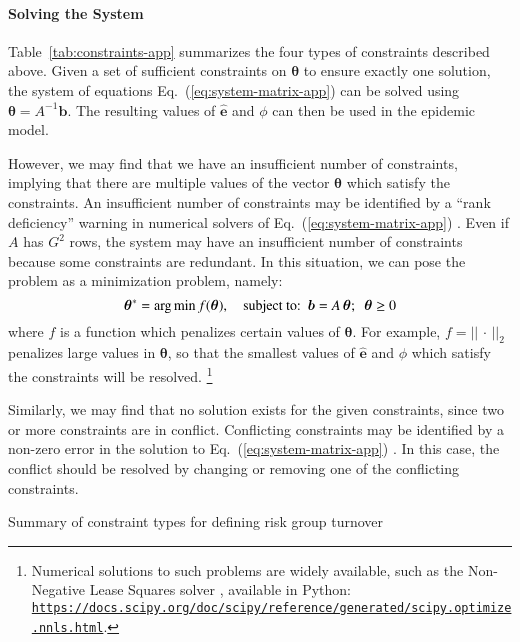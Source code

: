 \paragraph{Solving the System}
\label{p:solving}
Table~\ref{tab:constraints-app} summarizes the four types of constraints described above.
Given a set of sufficient constraints on $\bm{\theta}$
to ensure exactly one solution, the system of equations Eq.~(\ref{eq:system-matrix-app})
can be solved using $\bm{\theta} = A^{-1}\bm{b}$.
The resulting values of $\bm{\hat{e}}$ and $\phi$ can then be used
in the epidemic model.
\par
However, we may find that we have an insufficient number of constraints, implying that
there are multiple values of the vector $\bm{\theta}$ which satisfy the constraints.
An insufficient number of constraints may be identified
by a ``rank deficiency'' warning
in numerical solvers of Eq.~(\ref{eq:system-matrix-app}) \citep{LAPACK}.
Even if $A$ has $G^2$ rows,
the system may have an insufficient number of constraints
because some constraints are redundant.
In this situation, we can pose the problem as a minimization problem, namely:
\begin{equation}\label{eq:system-optimize}
\bm{\theta}^{*} = {\arg \min}
\thinspace f(\bm{\theta}),
\quad \textrm{subject to:}
\enspace\bm{b} = A\thinspace\bm{\theta};
\enspace\bm{\theta} \ge 0
\end{equation}
where $f$ is a function which penalizes certain values of $\bm{\theta}$.
For example, $f = {\left|\left| \,\cdot\, \right|\right|}_2$
penalizes large values in $\bm{\theta}$,
so that the smallest values of $\bm{\hat{e}}$ and $\phi$
which satisfy the constraints will be resolved.%
\footnote{Numerical solutions to such problems are widely available,
  such as the Non-Negative Lease Squares solver \citep{Lawson1995},
  available in Python:
  \href{https://docs.scipy.org/doc/scipy/reference/generated/scipy.optimize.nnls.html}
  {\texttt{https://docs.scipy.org/doc/scipy/reference/generated/scipy.optimize.nnls.html}}.}
\par
Similarly, we may find that no solution exists for the given constraints,
since two or more constraints are in conflict.
Conflicting constraints may be identified by a non-zero error
in the solution to Eq.~(\ref{eq:system-matrix-app}) \citep{LAPACK}.
In this case, the conflict should be resolved by
changing or removing one of the conflicting constraints.
\begin{table}
  \centering
  \caption{Summary of constraint types for defining risk group turnover}
  \label{tab:constraints-app}
  
\end{table}

